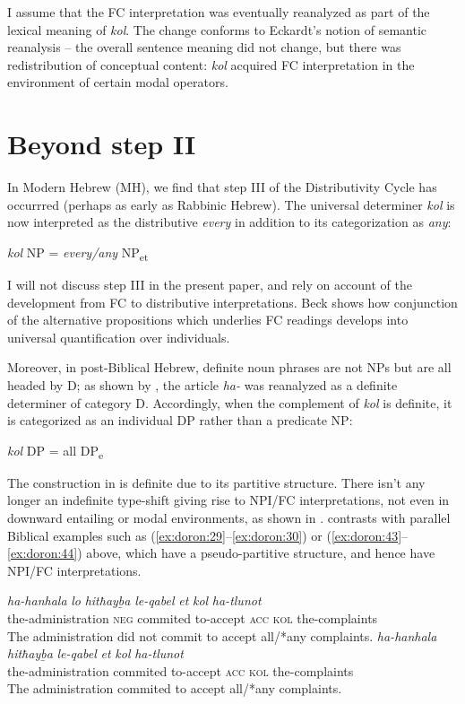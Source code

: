 \documentclass[output=paper]{langsci/langscibook}
\begin{document}
I assume that the FC interpretation was eventually reanalyzed as part of the lexical meaning of \textit{kol}. The change conforms to Eckardt's \citeyearpar[236]{Eckardt2006} notion of semantic reanalysis – the overall sentence meaning did not change, but there was redistribution of conceptual content: \textit{kol} acquired FC interpretation in the environment of certain modal operators.

\section{Beyond step II}\label{sec:doron:6}%

In Modern Hebrew (MH), we find that step III of the Distributivity Cycle has occurrred (perhaps as early as Rabbinic Hebrew). The universal determiner \textit{kol} is now interpreted as the distributive \textit{every} in addition to its categorization as \textit{any}:

\ea%
    \label{ex:doron:56}
    \textit{kol} NP  =  \textit{every/any}   NP\textsubscript{et}
\z

I will not discuss step III in the present paper, and rely on  account of the development from FC to distributive interpretations. Beck shows how conjunction of the alternative propositions which underlies FC readings develops into universal quantification over individuals.

Moreover, in post-Biblical Hebrew, definite noun phrases are not NPs but are all headed by D; as shown by \citet{DoronMeir2016}, the article \textit{ha-} was reanalyzed as a definite determiner of category D. Accordingly, when the complement of \textit{kol} is definite, it is categorized as an individual DP rather than a predicate NP:

\ea%
    \label{ex:doron:57}
    \textit{kol} DP  =  all  DP\textsubscript{e}
\z

The construction in  is definite due to its partitive structure. There isn’t any longer an indefinite type-shift  giving rise to NPI/FC interpretations, not even in downward entailing or modal environments, as shown in .   contrasts with parallel Biblical examples such as (\ref{ex:doron:29}--\ref{ex:doron:30}) or (\ref{ex:doron:43}--\ref{ex:doron:44}) above, which have a pseudo-partitive structure, and hence have NPI/FC interpretations.

\ea%
    \label{ex:doron:58}
    \ea
    \gll \textit{ha-hanhala}            \textit{lo}     \textit{hitħayḇa}   \textit{le-qabel}     \textit{et}    \textit{kol}    \textit{ha-tlunot} \\
         the-administration \textsc{neg} commited  to-accept  \textsc{acc} \textsc{kol}  the-complaints  \\
    \glt The administration did not commit to accept all/*any complaints.
    \ex
    \gll \textit{ha-hanhala}            \textit{hitħayḇa}    \textit{le-qabel}     \textit{et}    \textit{kol}   \textit{ha-tlunot}           \\
         the-administration commited  to-accept  \textsc{acc} \textsc{kol}  the-complaints  \\
    \glt The administration commited to accept all/*any complaints.
    \z
\z
\end{document}
